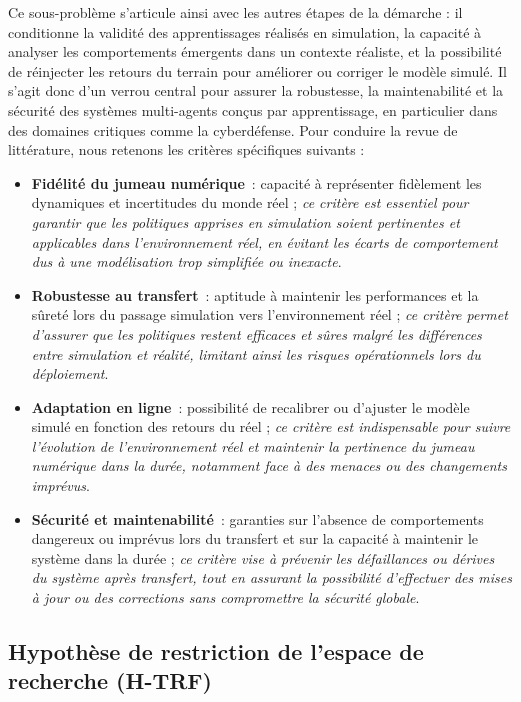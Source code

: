 Ce sous-problème s'articule ainsi avec les autres étapes de la démarche : il conditionne la validité des apprentissages réalisés en simulation, la capacité à analyser les comportements émergents dans un contexte réaliste, et la possibilité de réinjecter les retours du terrain pour améliorer ou corriger le modèle simulé. Il s'agit donc d'un verrou central pour assurer la robustesse, la maintenabilité et la sécurité des systèmes multi-agents conçus par apprentissage, en particulier dans des domaines critiques comme la cyberdéfense.
Pour conduire la revue de littérature, nous retenons les critères spécifiques suivants :
%
\begin{itemize}
    \item \textbf{Fidélité du jumeau numérique}~: capacité à représenter fidèlement les dynamiques et incertitudes du monde réel ; \emph{ce critère est essentiel pour garantir que les politiques apprises en simulation soient pertinentes et applicables dans l’environnement réel, en évitant les écarts de comportement dus à une modélisation trop simplifiée ou inexacte}.
    \item \textbf{Robustesse au transfert}~: aptitude à maintenir les performances et la sûreté lors du passage simulation vers l'environnement réel ; \emph{ce critère permet d’assurer que les politiques restent efficaces et sûres malgré les différences entre simulation et réalité, limitant ainsi les risques opérationnels lors du déploiement}.
    \item \textbf{Adaptation en ligne}~: possibilité de recalibrer ou d’ajuster le modèle simulé en fonction des retours du réel ; \emph{ce critère est indispensable pour suivre l’évolution de l’environnement réel et maintenir la pertinence du jumeau numérique dans la durée, notamment face à des menaces ou des changements imprévus}.
    \item \textbf{Sécurité et maintenabilité}~: garanties sur l’absence de comportements dangereux ou imprévus lors du transfert et sur la capacité à maintenir le système dans la durée ; \emph{ce critère vise à prévenir les défaillances ou dérives du système après transfert, tout en assurant la possibilité d’effectuer des mises à jour ou des corrections sans compromettre la sécurité globale}.
\end{itemize}


\subsection*{Hypothèse de restriction de l’espace de recherche (\textbf{H-TRF})}

